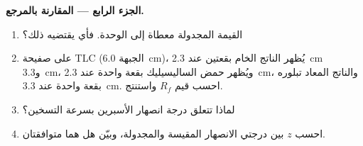 \begin{problem}
\noindent\textbf{الجزء الرابع --- المقارنة بالمرجع.}
\begin{enumerate}[resume]
  \item القيمة المجدولة معطاة إلى الوحدة. فأي  يقتضيه ذلك؟
  \item على صفيحة TLC (الجبهة \qty{6.0}{cm})، يُظهر الناتج الخام
        بقعتين عند \qty{2.3}{cm} و\qty{3.3}{cm}، ويُظهر حمض الساليسيليك بقعة واحدة
        عند \qty{2.3}{cm}، والناتج المعاد تبلوره بقعة واحدة عند
        \qty{3.3}{cm}. احسب قيم $R_f$ واستنتج.
  \item لماذا تتعلق درجة انصهار الأسبرين بسرعة التسخين؟
  \item احسب  $z$ بين درجتي الانصهار المقيسة
        والمجدولة، وبيّن هل هما متوافقتان.
\end{enumerate}
\end{problem}
